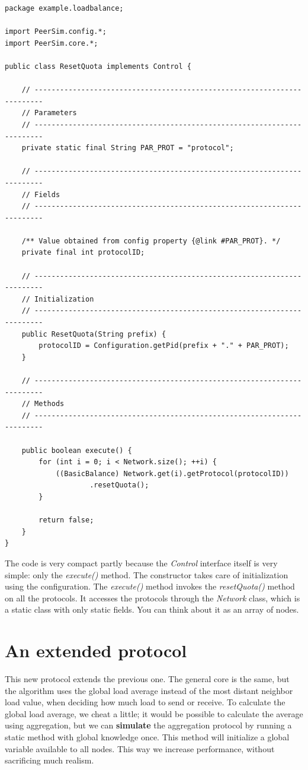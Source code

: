\documentclass[a4paper,11pt]{article}
\begin{document}
\footnotesize
\begin{verbatim}
package example.loadbalance;

import PeerSim.config.*;
import PeerSim.core.*;

public class ResetQuota implements Control {

    // ------------------------------------------------------------------------
    // Parameters
    // ------------------------------------------------------------------------
    private static final String PAR_PROT = "protocol";

    // ------------------------------------------------------------------------
    // Fields
    // ------------------------------------------------------------------------

    /** Value obtained from config property {@link #PAR_PROT}. */
    private final int protocolID;

    // ------------------------------------------------------------------------
    // Initialization
    // ------------------------------------------------------------------------
    public ResetQuota(String prefix) {
        protocolID = Configuration.getPid(prefix + "." + PAR_PROT);
    }

    // ------------------------------------------------------------------------
    // Methods
    // ------------------------------------------------------------------------

    public boolean execute() {
        for (int i = 0; i < Network.size(); ++i) {
            ((BasicBalance) Network.get(i).getProtocol(protocolID))
                    .resetQuota();
        }

        return false;
    }
}
\end{verbatim}
\normalsize

The code is very compact partly because the \emph{Control} interface itself
is very simple: only the \emph{execute()} method. The constructor takes
care of initialization using the configuration. The \emph{execute()}
method invokes the \emph{resetQuota()} method on all the protocols.
It accesses the protocols through the \emph{Network} class, which is a
static class with only static fields.
You can think about it as an array of nodes.


\section{An extended protocol}

This new protocol extends the previous one. The general
core is the same, but the algorithm uses the global load average
instead of the most distant neighbor load value, when deciding
how much load to send or receive. To calculate
the global load average, we cheat a little; it would be possible
to calculate the average using aggregation, but we can \textbf{simulate}
the aggregation protocol by running
a static method with global knowledge once. This method will initialize
a global variable available to all nodes.
This way we increase performance, without sacrificing much realism.
\end{document}
